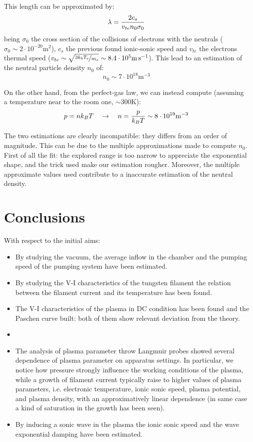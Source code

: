 \documentclass[11pt,a4 paper]{article}
\let\oldfrac\frac
\renewcommand{\frac}[3][d]{\ifthenelse{\equal{#1}{d}}{\oldfrac{#2}{#3}}{\nicefrac{#2}{#3}}}
\begin{document}
This length can be approximated by:
\begin{equation*}
  \lambda = \frac{2c_s}{v_{te}n_0\sigma_0}
\end{equation*}
being $\sigma_0$ the cross section of the collisions of electrons with the neutrals ($\sigma_0\sim2\cdot10^{-20}\si{\metre\squared}$), $c_s$ the previous found ionic-sonic speed and $v_{te}$ the electrons thermal speed ($v_{te}\sim\sqrt{\frac[f]{3k_bT_e}{m_e}}\sim8.4\cdot10^{5}\si{\metre\per\second}$). This lead to an estimation of the neutral particle density $n_0$ of:
\begin{equation*}
  n_0 \sim 7\cdot10^{18} \si{\metre^{-3}}
\end{equation*}

On the other hand, from the perfect-gas law, we can instead compute (assuming a temperature near to the room one, $\sim300\si{\kelvin}$):
\begin{equation*}
  p = nk_BT\quad\rightarrow\quad n = \frac{p}{k_BT} \sim 8\cdot10^{19} \si{\metre^{-3}}
\end{equation*}

The two estimations are clearly incompatible: they differs from an order of magnitude. This can be due to the multiple approximations made to compute $n_0$. First of all the fit: the explored range is too narrow to appreciate the exponential shape, and the trick used make our estimation rougher. Moreover, the multiple approximate values used contribute to a inaccurate estimation of the neutral density.

\section{Conclusions}
With respect to the initial aims:
\begin{itemize}
  \item By studying the vacuum, the average inflow in the chamber and the pumping speed of the pumping system have been estimated.
  \item By studying the V-I characteristics of the tungsten filament the relation between the filament current and its temperature has been found.
  \item The V-I characteristics of the plasma in DC condition has been found and the Paschen curve built: both of them show relevant deviation from the theory.
  \item {}
  \item The analysis of plasma parameter throw Langmuir probes showed several dependence of plasma parameter on apparatus settings. In particular, we notice how pressure strongly influence the working conditions of the plasma, while a growth of filament current typically raise to higher values of plasma parameters, i.e. electronic temperature, ionic sonic speed, plasma potential, and plasma density, with an approximatively linear dependence (in same case a kind of saturation in the growth has been seen).
  \item By inducing a sonic wave in the plasma the ionic sonic speed and the wave exponential damping have been estimated.
\end{itemize}


\end{document}
